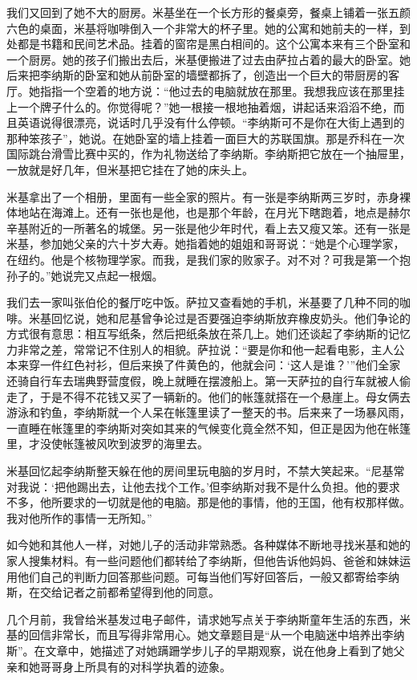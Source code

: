 我们又回到了她不大的厨房。米基坐在一个长方形的餐桌旁，餐桌上铺着一张五颜六色的桌面，米基将咖啡倒入一个非常大的杯子里。她的公寓和她前夫的一样，到处都是书籍和民间艺术品。挂着的窗帘是黑白相间的。这个公寓本来有三个卧室和一个厨房。她的孩子们搬出去后，米基便搬进了过去由萨拉占着的最大的卧室。她后来把李纳斯的卧室和她从前卧室的墙壁都拆了，创造出一个巨大的带厨房的客厅。她指指一个空着的地方说：“他过去的电脑就放在那里。我想我应该在那里挂上一个牌子什么的。你觉得呢？”她一根接一根地抽着烟，讲起话来滔滔不绝，而且英语说得很漂亮，说话时几乎没有什么停顿。“李纳斯可不是你在大街上遇到的那种笨孩子”，她说。在她卧室的墙上挂着一面巨大的苏联国旗。那是乔科在一次国际跳台滑雪比赛中买的，作为礼物送给了李纳斯。李纳斯把它放在一个抽屉里，一放就是好几年，但米基把它挂在了她的床头上。

米基拿出了一个相册，里面有一些全家的照片。有一张是李纳斯两三岁时，赤身裸体地站在海滩上。还有一张也是他，也是那个年龄，在月光下瞎跑着，地点是赫尔辛基附近的一所著名的城堡。另一张是他少年时代，看上去又瘦又笨。还有一张是米基，参加她父亲的六十岁大寿。她指着她的姐姐和哥哥说：“她是个心理学家，在纽约。他是个核物理学家。而我，是我们家的败家子。对不对？可我是第一个抱孙子的。”她说完又点起一根烟。

我们去一家叫张伯伦的餐厅吃中饭。萨拉又查看她的手机，米基要了几种不同的咖啡。米基回忆说，她和尼基曾争论过是否要强迫李纳斯放弃橡皮奶头。他们争论的方式很有意思：相互写纸条，然后把纸条放在茶几上。她们还谈起了李纳斯的记忆力非常之差，常常记不住别人的相貌。萨拉说：“要是你和他一起看电影，主人公本来穿一件红色衬衫，但后来换了件黄色的，他就会问：‘这人是谁？’”他们全家还骑自行车去瑞典野营度假，晚上就睡在摆渡船上。第一天萨拉的自行车就被人偷走了，于是不得不花钱又买了一辆新的。他们的帐篷就搭在一个悬崖上。母女俩去游泳和钓鱼，李纳斯就一个人呆在帐篷里读了一整天的书。后来来了一场暴风雨，一直睡在帐篷里的李纳斯对突如其来的气候变化竟全然不知，但正是因为他在帐篷里，才没使帐篷被风吹到波罗的海里去。

米基回忆起李纳斯整天躲在他的房间里玩电脑的岁月时，不禁大笑起来。“尼基常对我说：‘把他踢出去，让他去找个工作。’但李纳斯对我不是什么负担。他的要求不多，他所要求的一切就是他的电脑。那是他的事情，他的王国，他有权那样做。我对他所作的事情一无所知。”

如今她和其他人一样，对她儿子的活动非常熟悉。各种媒体不断地寻找米基和她的家人搜集材料。有一些问题他们都转给了李纳斯，但他告诉他妈妈、爸爸和妹妹运用他们自己的判断力回答那些问题。可每当他们写好回答后，一般又都寄给李纳斯，在交给记者之前都希望得到他的同意。

几个月前，我曾给米基发过电子邮件，请求她写点关于李纳斯童年生活的东西，米基的回信非常长，而且写得非常用心。她文章题目是“从一个电脑迷中培养出李纳斯”。在文章中，她描述了对她蹒跚学步儿子的早期观察，说在他身上看到了她父亲和她哥哥身上所具有的对科学执着的迹象。

